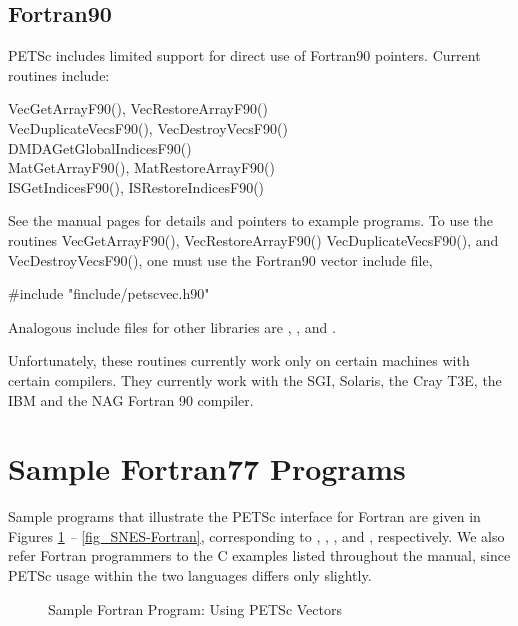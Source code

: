 \subsection{Fortran90}

PETSc includes limited support for direct use of Fortran90 pointers.
Current routines include:
\begin{tabbing}
 VecGetArrayF90(), VecRestoreArrayF90()\\
 VecDuplicateVecsF90(), VecDestroyVecsF90()\\
 DMDAGetGlobalIndicesF90()\\
 MatGetArrayF90(), MatRestoreArrayF90()\\
 ISGetIndicesF90(), ISRestoreIndicesF90()
\end{tabbing}
See the manual pages for details and pointers to example programs.  To
use the routines VecGetArrayF90(), VecRestoreArrayF90()
VecDuplicateVecsF90(), and VecDestroyVecsF90(), one must
use the Fortran90 vector include file,
\begin{tabbing}
    \#include "finclude/petscvec.h90"
\end{tabbing}
Analogous include files for other libraries are ,
, and .

Unfortunately, these routines currently work only on certain machines with 
certain compilers. They currently work with the SGI, Solaris, the Cray T3E, the
IBM and the NAG Fortran 90 compiler.

\section{Sample Fortran77 Programs}
\label{sec_fortran-examples}

Sample programs that illustrate the PETSc interface for Fortran
are given in Figures \ref{fig_vec-Fortran} {\em --} \ref{fig_SNES-Fortran},
corresponding to
, 
, 
\break {}, and 
, respectively.  We also
refer Fortran programmers to the C examples listed throughout the manual,
since PETSc usage within the two languages differs only slightly.

\begin{figure}[H]
{\small
{}
}
\caption{Sample Fortran Program:  Using PETSc Vectors}
\label{fig_vec-Fortran}
\end{figure}

